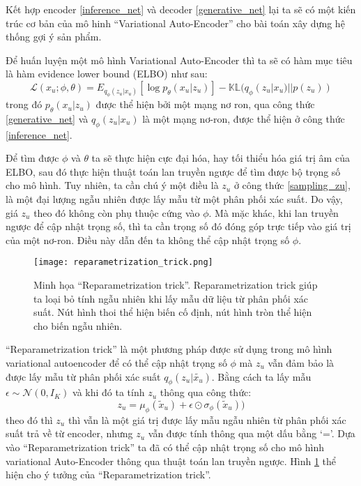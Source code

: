     Kết hợp encoder \ref{inference_net} và decoder \ref{generative_net} lại ta sẽ có một kiến trúc cơ bản của mô hinh ``Variational Auto-Encoder'' cho bài toán xây dựng hệ thống gợi ý sản phẩm.

    Để huấn luyện một mô hình Variational Auto-Encoder thì ta sẽ có hàm mục tiêu là hàm evidence lower bound (ELBO) như sau:
    \begin{equation}
        \label{elbo_mvae}
        \mathcal{L}(x_u;\phi,\theta) = E_{q_\phi(z_u|x_u)}[\log p_\theta(x_u|z_u)] - \mathbb{KL}(q_\phi(z_u|x_u) || p(z_u))
    \end{equation}
    trong đó $p_\theta(x_u|z_u)$ được thể hiện bởi một mạng nơ ron, qua công thức \ref{generative_net} và $q_\phi(z_u|x_u)$ là một mạng nơ-ron, được thể hiện ở công thức \ref{inference_net}.

    Để tìm được $\phi$ và $\theta$ ta sẽ thực hiện cực đại hóa, hay tối thiểu hóa giá trị âm của ELBO, sau đó thực hiện thuật toán lan truyền ngược để tìm được bộ trọng số cho mô hình. 
    Tuy nhiên, ta cần chú ý một điều là $z_u$ ở công thức \ref{sampling_zu}, là một đại lượng ngẫu nhiên được lấy mẫu từ một phân phối xác suất.
    Do vậy, giá $z_u$ theo đó không còn phụ thuộc cứng vào $\phi$.
    Mà mặc khác, khi lan truyền ngược để cập nhật trọng số, thì ta cần trọng số đó đóng góp trực tiếp vào giá trị của một nơ-ron.
    Điều này dẫn đến ta không thể cập nhật trọng số $\phi$. 
    \begin{figure}
        \centering
        \texttt{[image: reparametrization\_trick.png]}
        \caption{Minh họa ``Reparametrization trick''. Reparametrization trick giúp ta loại bỏ tính ngẫu nhiên khi lấy mẫu dữ liệu từ phân phối xác suất. Nút hình thoi thể hiện biến cố định, nút hình tròn thể hiện cho biến ngẫu nhiên.}
        \label{fig_repatrick}
    \end{figure}
    ``Reparametrization trick'' là một phương pháp được sử dụng trong mô hình variational autoencoder để có thể cập nhật trọng số $\phi$ mà $z_u$ vẫn đảm bảo là được lấy mẫu từ phân phối xác suất $q_\phi(z_u|\tilde{x_u})$. 
    Bằng cách ta lấy mẫu $\epsilon \sim \mathcal{N}(0,I_K)$ và khi đó ta tính $z_u$ thông qua công thức:
    \begin{equation}
        z_u = \mu_\phi(\tilde{x}_u) + \epsilon \odot \sigma_\phi(\tilde{x}_u))
    \end{equation}
    theo đó thì $z_u$ thì vẫn là một giá trị được lấy mẫu ngẫu nhiên từ phân phối xác suất trả về từ encoder, nhưng $z_u$ vẫn được tính thông qua một dấu bằng `='.
    Dựa vào ``Reparametrization trick'' ta đã có thể cập nhật trọng số cho mô hình variational Auto-Encoder thông qua thuật toán lan truyền ngược. 
    Hình \ref{fig_repatrick} thể hiện cho ý tưởng của ``Reparametrization trick''.

